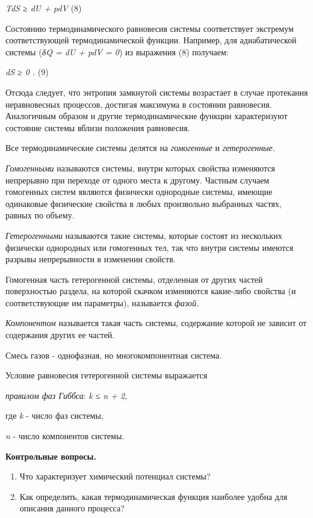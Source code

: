 \emph{TdS ≥ dU + pdV} (8)

Состоянию термодинамического равновесия системы соответствует экстремум
соответствующей термодинамической функции. Например, для адиабатической
системы (\emph{δQ = dU + pdV = 0}) из выражения (8) получаем:

\emph{dS ≥ 0 .} (9)

Отсюда следует, что энтропия замкнутой системы возрастает в случае
протекания неравновесных процессов, достигая максимума в состоянии
равновесия. Аналогичным образом и другие термодинамические функции
характеризуют состояние системы вблизи положения равновесия.

Все термодинамические системы делятся на \emph{гомогенные} и
\emph{гетерогенные.}

\emph{Гомогенными} называются системы, внутри которых свойства
изменяются непрерывно при переходе от одного места к другому. Частным
случаем гомогенных систем являются физически однородные системы, имеющие
одинаковые физические свойства в любых произвольно выбранных частях,
равных по объему.

\emph{Гетерогенными} называются такие системы, которые состоят из
нескольких физически однородных или гомогенных тел, так что внутри
системы имеются разрывы непрерывности в изменении свойств.

Гомогенная часть гетерогенной системы, отделенная от других частей
поверхностью раздела, на которой скачком изменяются какие-либо свойства
(и соответствующие им параметры), называется \emph{фазой.}

\emph{Компонентом} называется такая часть системы, содержание которой не
зависит от содержания других ее частей.

Смесь газов - однофазная, но многокомпонентная система.

Условие равновесия гетерогенной системы выражается

\emph{правилом фаз Гиббса}: \emph{k ≤ n + 2},

где \emph{k} - число фаз системы,

\emph{n} - число компонентов системы.

\textbf{Контрольные вопросы.}

\begin{enumerate}
\def\labelenumi{\arabic{enumi}.}
\item
  Что характеризует химический потенциал системы?
\item
  Как определить, какая термодинамическая функция наиболее удобна для
  описания данного процесса?
\end{enumerate}

